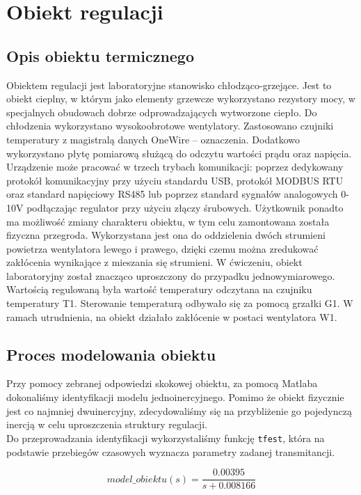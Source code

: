\documentclass{mwrep}
\begin{document}
\chapter{Obiekt regulacji}
\label{ObiektRegulacji}

\section{Opis obiektu termicznego}
\label{ObiektTermiczny}
Obiektem regulacji jest laboratoryjne stanowisko chłodząco-grzejące. Jest to obiekt cieplny, 
w którym jako elementy grzewcze wykorzystano rezystory mocy, w specjalnych obudowach dobrze odprowadzających
wytworzone ciepło. Do chłodzenia wykorzystano wysokoobrotowe
wentylatory. Zastosowano czujniki temperatury z magistralą danych
OneWire – oznaczenia. Dodatkowo wykorzystano płytę pomiarową
służącą do odczytu wartości prądu oraz napięcia. Urządzenie może pracować w trzech trybach komunikacji: poprzez
dedykowany protokół komunikacyjny przy użyciu standardu USB,
protokół MODBUS RTU oraz standard napięciowy RS485 lub poprzez
standard sygnałów analogowych 0-10V podłączając regulator przy użyciu złączy
śrubowych. Użytkownik ponadto ma możliwość zmiany charakteru obiektu, w tym celu
zamontowana została fizyczna przegroda. Wykorzystana jest ona do oddzielenia dwóch
strumieni powietrza wentylatora lewego i prawego, dzięki czemu można zredukować
zakłócenia wynikające z mieszania się strumieni. W ćwiczeniu, obiekt laboratoryjny
został znacząco uproszczony do przypadku jednowymiarowego. Wartością regulowaną była
wartość temperatury odczytana na czujniku temperatury T1. Sterowanie temperaturą odbywało się 
za pomocą grzałki G1. W ramach utrudnienia, na obiekt działało zakłócenie w postaci wentylatora W1.


\section{Proces modelowania obiektu}
\label{ModelowanieObiektu}
Przy pomocy zebranej odpowiedzi skokowej obiektu, za pomocą Matlaba dokonaliśmy identyfikacji 
modelu jednoinercyjnego. Pomimo że obiekt fizycznie jest co najmniej dwuinercyjny, zdecydowaliśmy się na 
przybliżenie go pojedynczą inercją w celu uproszczenia struktury regulacji. \\
\indent Do przeprowadzania identyfikacji wykorzystaliśmy funkcję \texttt{tfest}, która na podstawie 
przebiegów czasowych wyznacza parametry zadanej transmitancji. 

\[model\_obiektu(s) = \frac{0.00395}{s + 0.008166}\]
\end{document}
